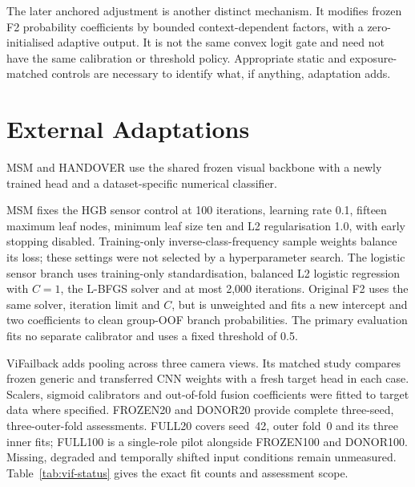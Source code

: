 The later anchored adjustment is another distinct mechanism. It modifies frozen F2
probability coefficients by bounded context-dependent factors, with a zero-initialised
adaptive output. It is not the same convex logit gate and need not have the same
calibration or threshold policy. Appropriate static and exposure-matched controls are
necessary to identify what, if anything, adaptation adds.

\section{External Adaptations}
MSM and HANDOVER use the shared frozen visual backbone with a newly trained head and a
dataset-specific numerical classifier.

MSM fixes the HGB sensor control at 100 iterations, learning rate 0.1, fifteen maximum
leaf nodes, minimum leaf size ten and L2 regularisation 1.0, with early stopping
disabled. Training-only inverse-class-frequency sample weights balance its loss; these
settings were not selected by a hyperparameter search. The logistic sensor branch uses
training-only standardisation, balanced L2 logistic regression with $C=1$, the L-BFGS
solver and at most 2,000 iterations. Original F2 uses the same solver, iteration limit
and $C$, but is unweighted and fits a new intercept and two coefficients to clean
group-OOF branch probabilities. The primary evaluation fits no separate calibrator and
uses a fixed threshold of 0.5.

ViFailback adds pooling across three camera views. Its matched study compares frozen
generic and transferred CNN weights with a fresh target head in each case. Scalers,
sigmoid calibrators and out-of-fold fusion coefficients were fitted to target data
where specified. FROZEN20 and DONOR20 provide complete three-seed, three-outer-fold
assessments. FULL20 covers seed~42, outer fold~0 and its three inner fits; FULL100 is a
single-role pilot alongside FROZEN100 and DONOR100. Missing, degraded and temporally
shifted input conditions remain unmeasured. Table~\ref{tab:vif-status} gives the exact
fit counts and assessment scope.
